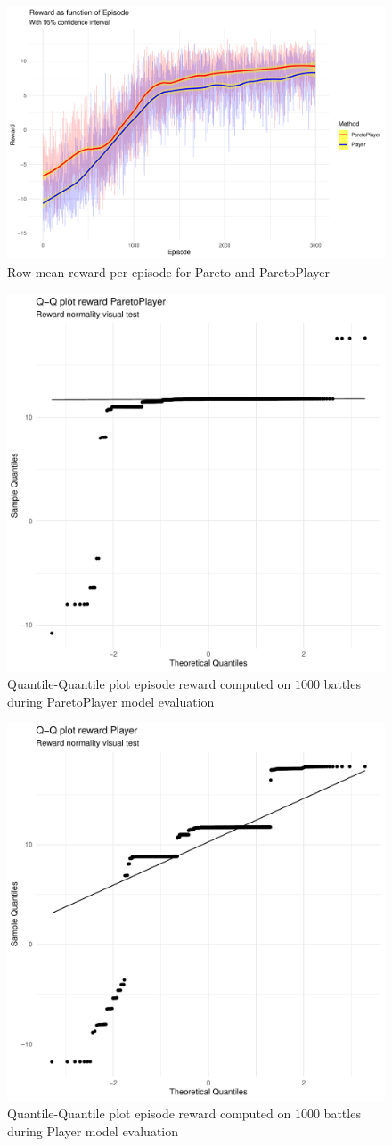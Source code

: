 \documentclass[journal]{IEEEtran}
\begin{document}
\begin{figure}[H]
    \centering
    \includegraphics[width=0.8\linewidth]{images/reward_on_episode.pdf}
    \caption{Row-mean reward per episode for Pareto and ParetoPlayer}
    \label{fig:reward_per_episode}
\end{figure}

\begin{figure}[H]
    \centering
    \includegraphics[width=0.6\linewidth]{images/Normality_QQ_Pareto.pdf}
    \caption{Quantile-Quantile plot episode reward computed on $1000$ battles during ParetoPlayer model evaluation}
    \label{fig:qq_pareto}
\end{figure}
\begin{figure}[H]
    \centering
    \includegraphics[width=0.6\linewidth]{images/Normality_QQ_Random.pdf}
    \caption{Quantile-Quantile plot episode reward computed on $1000$ battles during Player model evaluation}
    \label{fig:qq_random}
\end{figure}
\end{document}
